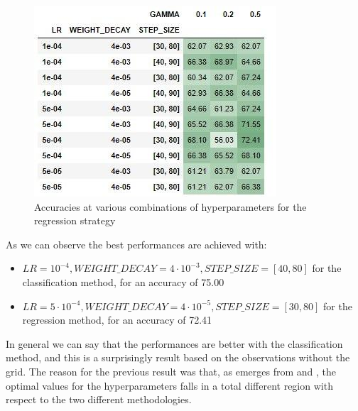 \documentclass[10pt,twocolumn,hidelinks,letterpaper]{article}
\begin{document}
\begin{figure}[t]
	\centering
	\includegraphics[width=\linewidth]{images/grid_reg_table.jpg}
	\caption{Accuracies at various combinations of hyperparameters for the regression strategy}
	\label{ms_reg_grid}
\end{figure}

As we can observe the best performances are achieved with:
\begin{itemize}
  \item $LR = 10^{-4}, WEIGHT\_DECAY = 4 \cdot 10^{-3}, STEP\_SIZE = [40, 80]$ for the classification method, for an accuracy of 75.00
    \item $LR = 5 \cdot 10^{-4}, WEIGHT\_DECAY = 4 \cdot 10^{-5}, STEP\_SIZE = [30, 80]$ for the regression method, for an accuracy of 72.41
\end{itemize}

In general we can say that the performances are better with the classification method, and this is a surprisingly result based on the observations without the grid. The reason for the previous result was that, as emerges from  and , the optimal values for the hyperparameters falls in a total different region with respect to the two different methodologies.
\end{document}
